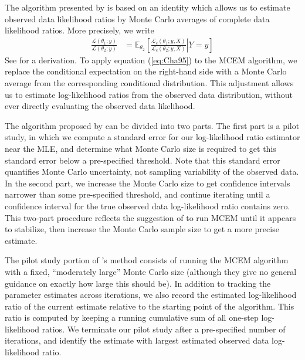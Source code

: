 \documentclass[11pt, oneside]{article}   	%
\newcommand{\bE}{\mathbb{E}}
\begin{document}
The algorithm presented by \citeauthor{Cha95} is based on an identity which allows us to estimate observed data likelihood ratios by Monte Carlo averages of complete data likelihood ratios. More precisely, we write
%
\begin{align}
	\frac{\mathcal{L}(\theta_1; y)}{\mathcal{L}(\theta_2; y)} &= \bE_{\theta_2} \left[ \left. \frac{\mathcal{L}_c(\theta_1; y, X)}{\mathcal{L}_c(\theta_2; y, X)} \right| Y=y \right] \label{eq:Cha95}
\end{align}
%
See \citeauthor{Cha95} for a derivation. To apply equation (\ref{eq:Cha95}) to the MCEM algorithm, we replace the conditional expectation on the right-hand side with a Monte Carlo average from the corresponding conditional distribution. This adjustment allows us to estimate log-likelihood ratios from the observed data distribution, without ever directly evaluating the observed data likelihood. 



The algorithm proposed by \citeauthor{Cha95} can be divided into two parts. The first part is a pilot study, in which we compute a standard error for our log-likelihood ratio estimator near the MLE, and determine what Monte Carlo size is required to get this standard error below a pre-specified threshold. Note that this standard error quantifies Monte Carlo uncertainty, not sampling variability of the observed data. In the second part, we increase the Monte Carlo size to get confidence intervals narrower than some pre-specified threshold, and continue iterating until a confidence interval for the true observed data log-likelihood ratio contains zero. This two-part procedure reflects the suggestion of \citet{Wei90} to run MCEM until it appears to stabilize, then increase the Monte Carlo sample size to get a more precise estimate.


The pilot study portion of \citeauthor{Cha95}'s method consists of running the MCEM algorithm with a fixed, ``moderately large'' Monte Carlo size (although they give no general guidance on exactly how large this should be).  In addition to tracking the parameter estimates across iterations, we also record the estimated log-likelihood ratio of the current estimate relative to the starting point of the algorithm. This ratio is computed by keeping a running cumulative sum of all one-step log-likelihood ratios. We terminate our pilot study after a pre-specified number of iterations, and identify the estimate with largest estimated observed data log-likelihood ratio. 
\end{document}
